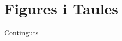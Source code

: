 \section{Figures i Taules}

\begin{frame}{Continguts}
\begin{multicols}{2}
\tableofcontents[currentsection]
\end{multicols}
\end{frame}

